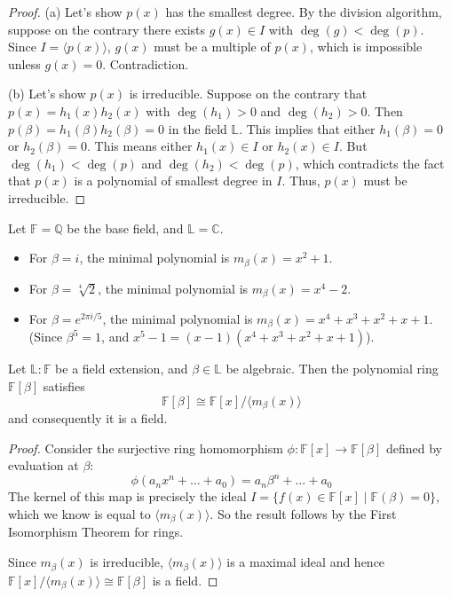 \begin{proof}
(a) Let's show $p(x)$ has the smallest degree. By the division algorithm, suppose on the contrary there exists $g(x) \in I$ with $\deg(g) < \deg(p)$. Since $I=\langle p(x) \rangle$, $g(x)$ must be a multiple of $p(x)$, which is impossible unless $g(x)=0$. Contradiction.

(b) Let's show $p(x)$ is irreducible. Suppose on the contrary that $p(x) = h_1(x)h_2(x)$ with $\deg(h_1) > 0$ and $\deg(h_2) > 0$.
Then $p(\beta) = h_1(\beta)h_2(\beta) = 0$ in the field $\mathbb{L}$.
This implies that either $h_1(\beta)=0$ or $h_2(\beta)=0$.
This means either $h_1(x) \in I$ or $h_2(x) \in I$.
But $\deg(h_1) < \deg(p)$ and $\deg(h_2) < \deg(p)$, which contradicts the fact that $p(x)$ is a polynomial of smallest degree in $I$. Thus, $p(x)$ must be irreducible.
\end{proof}


\begin{example}
Let $\mathbb{F} = \mathbb{Q}$ be the base field, and $\mathbb{L} = \mathbb{C}$.
\begin{itemize}
    \item For $\beta = i$, the minimal polynomial is $m_{\beta}(x) = x^2+1$.
    \item For $\beta = \sqrt[4]{2}$, the minimal polynomial is $m_{\beta}(x) = x^4-2$.
    \item For $\beta = e^{2\pi i/5}$, the minimal polynomial is $m_{\beta}(x) = x^4+x^3+x^2+x+1$. \\(Since $\beta^5=1$, and $x^5-1 = (x-1)(x^4+x^3+x^2+x+1)$).
\end{itemize}
\end{example}

\begin{theorem}
Let $\mathbb{L}:\mathbb{F}$ be a field extension, and $\beta \in \mathbb{L}$ be algebraic. Then the polynomial ring $\mathbb{F}[\beta]$ satisfies
$$\mathbb{F}[\beta] \cong \mathbb{F}[x]/\langle m_\beta(x) \rangle$$ 
and consequently it is a field.
\end{theorem}
\begin{proof}
Consider the surjective ring homomorphism $\phi: \mathbb{F}[x] \to \mathbb{F}[\beta]$ defined by evaluation at $\beta$:
\[ \phi(a_n x^n + \dots + a_0) = a_n \beta^n + \dots + a_0 \]
The kernel of this map is precisely the ideal $I = \{ f(x) \in \mathbb{F}[x] \mid \mathbb{F}(\beta)=0 \}$, which we know is equal to $\langle m_\beta(x) \rangle$.
So the result follows by the First Isomorphism Theorem for rings. 

Since $m_\beta(x)$ is irreducible, $\langle m_\beta(x) \rangle$ is a maximal ideal and hence $\mathbb{F}[x]/\langle m_\beta(x) \rangle \cong \mathbb{F}[\beta]$ is a field.
\end{proof}

